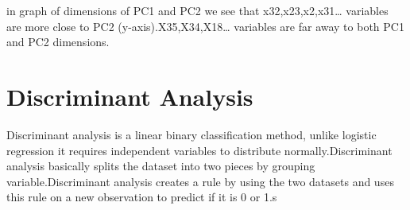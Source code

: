 \documentclass[12pt,twoside]{deuthesis}
\begin{document}
in graph of dimensions of PC1 and PC2 we see that x32,x23,x2,x31\ldots{} variables are more close to
PC2 (y-axis).X35,X34,X18\ldots{} variables are far away to both PC1 and PC2 dimensions.

\hypertarget{discriminant-analysis}{%
\section{Discriminant Analysis}\label{discriminant-analysis}}

Discriminant analysis is a linear binary classification method, unlike logistic regression it requires independent variables to distribute normally.Discriminant analysis basically splits the dataset into two pieces by grouping variable.Discriminant analysis creates a rule by using the two datasets and uses this rule on a new observation to predict if it is 0 or 1.s
\end{document}
